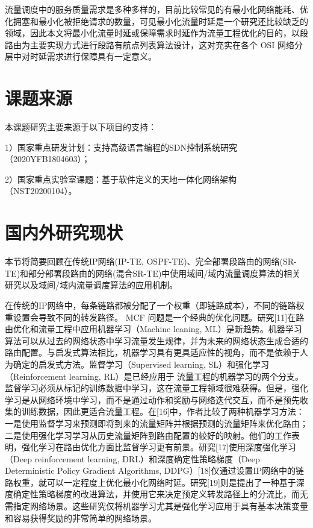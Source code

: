 流量调度中的服务质量需求是多种多样的，目前比较常见的有最小化网络能耗、优化拥塞和最小化被拒绝请求的数量，可见最小化流量时延是一个研究还比较缺乏的领域，因此本文将最小化流量时延或保障需求时延作为流量工程优化的目的，以段路由为主要实现方式进行段路有航点列表算法设计，这对充实在各个 \gls*{OSI} 网络分层中对时延需求进行保障具有一定意义。

\section{课题来源}
本课题研究主要来源于以下项目的支持：

1）国家重点研发计划：支持高级语言编程的SDN控制系统研究（2020YFB1804603）；

2）国家重点实验室课题：基于软件定义的天地一体化网络架构（NST20200104）。

\section{国内外研究现状}

本节将简要回顾在传统IP网络(IP-TE, OSPF-TE)、完全部署段路由的网络(SR-TE)和部分部署段路由的网络(混合SR-TE)中使用域间/域内流量调度算法的相关研究以及域间/域内流量调度算法的应用机制。

在传统的IP网络中，每条链路都被分配了一个权重（即链路成本），不同的链路权重设置会导致不同的转发路径。 \gls*{MCF} 问题是一个经典的优化问题。研究[11]在路由优化和流量工程中应用机器学习（Machine leaning, ML）是新趋势。机器学习算法可以从过去的网络状态中学习流量发生规律，并为未来的网络状态生成合适的路由配置。与启发式算法相比，机器学习具有更具适应性的视角，而不是依赖于人为确定的启发式方法。监督学习（Supervised learning, SL）和强化学习（Reinforcement learning, RL）是已经应用于 流量工程的机器学习的两个分支。监督学习必须从标记的训练数据中学习，这在流量工程领域很难获得。但是，强化学习是从网络环境中学习，而不是通过动作和奖励与网络迭代交互，而不是预先收集的训练数据，因此更适合流量工程。在[16]中，作者比较了两种机器学习方法：一是使用监督学习来预测即将到来的流量矩阵并根据预测的流量矩阵来优化路由；二是使用强化学习学习从历史流量矩阵到路由配置的较好的映射。他们的工作表明，强化学习在路由优化方面比监督学习更有前景。研究[17]使用深度强化学习（Deep reinforcement learning, DRL）和深度确定性策略梯度（Deep Deterministic Policy Gradient Algorithms, DDPG）[18]仅通过设置IP网络中的链路权重，就可以一定程度上优化最小化网络时延。研究[19]则是提出了一种基于深度确定性策略梯度的改进算法，并使用它来决定预定义转发路径上的分流比，而无需指定网络场景。这些研究仅将机器学习尤其是强化学习应用于具有基本决策变量和容易获得奖励的非常简单的网络场景。

